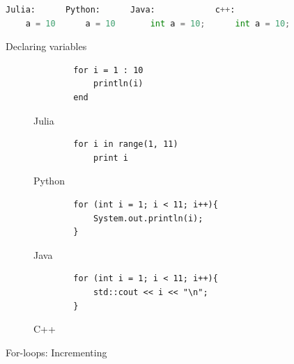\documentclass[a4paper, 11pt, titlepage]{article}
\begin{document}
\begin{figure}[H]
	\begin{lstlisting}[language=python]
	Julia:	    Python:      Java:            c++:
	a = 10	    a = 10       int a = 10;      int a = 10;
	\end{lstlisting}
	\caption{Declaring variables}
	\label{variables}
\end{figure}

\begin{figure}[H]
	\centering
	\begin{subfigure}[b]{0.7\textwidth}
		\centering
		\begin{lstlisting}
		for i = 1 : 10
			println(i)
		end
		\end{lstlisting}
		\caption{Julia}
	\end{subfigure}
	\begin{subfigure}[b]{0.7\textwidth}
		\centering
		\begin{lstlisting}
		for i in range(1, 11)
			print i
		\end{lstlisting}
		\caption{Python}
	\end{subfigure}	
	\begin{subfigure}[b]{0.7\textwidth}
		\centering
		\begin{lstlisting}
		for (int i = 1; i < 11; i++){
			System.out.println(i);
		}
		\end{lstlisting}
		\caption{Java}
	\end{subfigure}
	\begin{subfigure}[b]{0.7\textwidth}
		\centering
		\begin{lstlisting}
		for (int i = 1; i < 11; i++){
			std::cout << i << "\n";
		}
		\end{lstlisting}
		\caption{C++}
	\end{subfigure}
	\caption{For-loops: Incrementing}
	\label{forloop+}
\end{figure}
\end{document}
